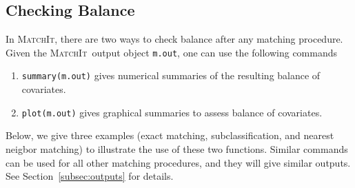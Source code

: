 \documentclass[oneside,letterpaper,titlepage]{article}
\newcommand{\MatchIt}{\textsc{MatchIt}}
\begin{document}

\subsection{Checking Balance}
\label{subsec:balance}

In \MatchIt, there are two ways to check balance after any matching
procedure. Given the \MatchIt\ output object {\tt m.out}, one can use
the following commands
\begin{enumerate}
\item \texttt{summary(m.out)} gives numerical summaries of the
  resulting balance of covariates.

\item \texttt{plot(m.out)} gives graphical summaries to assess balance
  of covariates.
\end{enumerate}
Below, we give three examples (exact matching, subclassification, and
nearest neigbor matching) to illustrate the use of these two
functions. Similar commands can be used for all other matching
procedures, and they will give similar outputs. See
Section~\ref{subsec:outputs} for details.
\end{document}
